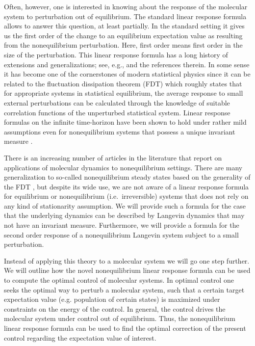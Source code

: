 \documentclass[]{tMPH2e}
\begin{document}
Often, however, one is interested in knowing about the response of the molecular system to perturbation out of equilibrium. The standard linear response formula allows to answer this question, at least partially. In the standard setting it gives us the first order of the change to an equilibrium expectation value as resulting from the nonequilibrium perturbation. Here, first order means first order in the size of the perturbation. This linear response formula has a long history of extensions and generalizations; see, e.g., \cite{marconi2008,ruelle2009} and the references therein. In some sense it has become one of the cornerstones of modern statistical physics since it can be related to the fluctuation dissipation theorem (FDT) which roughly states that for appropriate systems in statistical equilibrium, the average response to small external perturbations can be calculated through the knowledge of suitable correlation functions of the unperturbed statistical system. Linear response formulas on the infinite time-horizon have been shown to hold under rather mild assumptions even for nonequilibrium systems that possess a unique invariant measure \cite{hairer2008}. 

There is an increasing number of articles in the literature that report on applications of molecular dynamics to nonequilibrium settings. There are many generalization to so-called nonequilibrium steady states based on the generality of the FDT \cite{Seifert}, but despite its wide use, we are not aware of a linear response formula for equilibrium or nonequilibrium (i.e.~irreversible) systems that does not rely on any kind of stationarity assumption. We will provide such a formula for the case that the underlying dynamics can be described by Langevin dynamics that may not have an invariant measure. Furthermore, we will provide a formula for the second order response of a nonequilibrium Langevin system subject to a small perturbation.

Instead of applying this theory to a molecular system we will go one step further. We will outline how the novel nonequilibrium linear response formula can be used to compute the optimal control of molecular systems. In optimal control one seeks the optimal way to perturb a molecular system, such that a certain target expectation value (e.g. population of certain states) is maximized under constraints on the energy of the control. In general, the control drives the molecular system under control out of equilibrium. Thus, the nonequilibrium linear response formula can be used to find the optimal correction of the present control regarding the expectation value of interest. 
\end{document}
